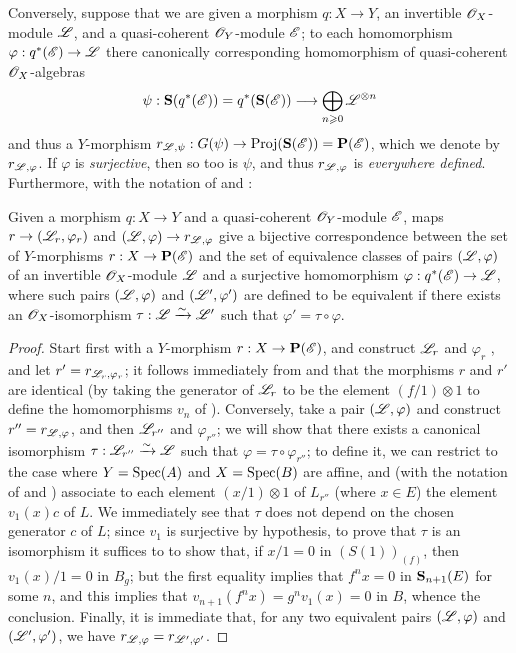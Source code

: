 \begin{env}[4.2.2]
\label{II.4.2.2}
Conversely, suppose that we are given a morphism $q:X\to Y$, an invertible $\mathscr{O}_X$-module $\mathscr{L}$, and a quasi-coherent $\mathscr{O}_Y$-module $\mathscr{E}$;
to each homomorphism $\varphi:q^*(\sh{E})\to\sh{L}$ there canonically corresponding homomorphism of quasi-coherent $\mathscr{O}_X$-algebras
\[
  \psi: \bb{S}(q^*(\sh{E})) = q^*(\bb{S}(\sh{E})) \to \bigoplus_{n\geq0}\sh{L}^{\otimes n}
\]
and thus  a $Y$-morphism $r_{\sh{L},\psi}:G(\psi)\to\Proj(\bb{S}(\sh{E}))=\bb{P}(\sh{E})$, which we denote by $r_{\mathscr{L},\varphi}$.
If $\varphi$ is \emph{surjective}, then so too is $\psi$, and thus  $r_{\mathscr{L},\varphi}$ is \emph{everywhere defined}.
Furthermore, with the notation of  and :
\end{env}

\begin{proposition}[4.2.3]
\label{II.4.2.3}
Given a morphism $q:X\to Y$ and a quasi-coherent $\mathscr{O}_Y$-module $\mathscr{E}$, maps $r\to(\sh{L}_r,\varphi_r)$ and $(\sh{L},\varphi)\to r_{\sh{L},\varphi}$ give a bijective correspondence between the set of $Y$-morphisms $r:X\to\bb{P}(\sh{E})$ and the set of equivalence classes of pairs $(\mathscr{L},\varphi)$ of an invertible $\mathscr{O}_X$-module $\mathscr{L}$ and a surjective homomorphism $\varphi:q^*(\sh{E})\to\sh{L}$, where such pairs $(\mathscr{L},\varphi)$ and $(\mathscr{L}',\varphi')$ are defined to be equivalent if there exists an $\mathscr{O}_X$-isomorphism $\tau:\mathscr{L}\xrightarrow{\sim}\mathscr{L}'$ such that $\varphi'=\tau\circ\varphi$.
\end{proposition}

\begin{proof}
Start first with a $Y$-morphism $r:X\to\bb{P}(\sh{E})$, and construct $\mathscr{L}_r$ and $\varphi_r$ , and let $r'=r_{\mathscr{L}_r,\varphi_r}$;
it follows immediately from  and  that the morphisms $r$ and $r'$ are identical (by taking the generator of $\mathscr{L}_r$ to be the element $(f/1)\otimes1$ to define the homomorphisms $v_n$ of ).
Conversely, take a pair $(\mathscr{L},\varphi)$ and construct
$r''=r_{\mathscr{L},\varphi}$, and then $\mathscr{L}_{r''}$ and $\varphi_{r''}$;
we will show that there exists a canonical isomorphism $\tau:\mathscr{L}_{r''}\xrightarrow{\sim}\mathscr{L}$ such that $\varphi=\tau\circ\varphi_{r''}$;
to define it, we can restrict to the case where $Y=\operatorname{Spec}(A)$ and $X=\operatorname{Spec}(B)$ are affine, and (with the notation of  and ) associate to each element $(x/1)\otimes1$ of $L_{r''}$ (where $x\in E$) the element $v_1(x)c$ of $L$.
We immediately see that $\tau$ does not depend on the chosen generator $c$ of $L$;
since $v_1$ is surjective by hypothesis, to prove that $\tau$ is an isomorphism it suffices to to show that, if $x/1=0$ in $(S(1))_{(f)}$, then $v_1(x)/1=0$ in $B_g$;
but the first equality implies that $f^nx=0$ in $\mathbf{S}_{n+1}(E)$ for some $n$, and this implies that $v_{n+1}(f^nx) = g^nv_1(x) = 0$ in $B$, whence the conclusion.
Finally, it is immediate that, for any two equivalent pairs $(\mathscr{L},\varphi)$ and $(\mathscr{L}',\varphi')$, we have $r_{\mathscr{L},\varphi}=r_{\mathscr{L}',\varphi'}$.
\end{proof}


